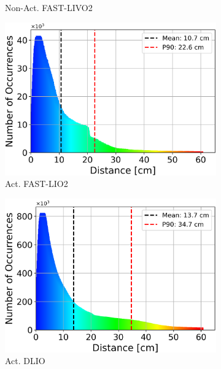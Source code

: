 \documentclass[a4paper, conference]{IEEEtran}
\begin{document}
\begin{figure}
\begin{subfigure}{0.19\textwidth}
    \caption{Non-Act. FAST-LIVO2}
    \label{fig:hist_non_livo}
\end{subfigure}
\hfill
\begin{subfigure}{0.19\textwidth}
    \centering
    \includegraphics[width=\textwidth]{pics/histogram_results/histogram_cond_actuated_lio.png}
    \caption{Act. FAST-LIO2}
    \label{fig:hist_act_lio}
\end{subfigure}
\hfill
\begin{subfigure}{0.19\textwidth}
    \centering
    \includegraphics[width=\textwidth]{pics/histogram_results/histogram_cond_actuated_dlio.png}
    \caption{Act. DLIO}
    \label{fig:hist_act_dlio}
\end{subfigure}
\hfill
\begin{subfigure}{0.19\textwidth}

\end{subfigure}
\end{figure}
\end{document}
